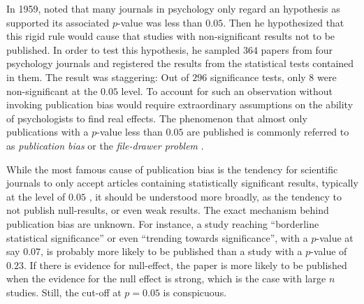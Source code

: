 In 1959,  noted that many journals in psychology only regard an hypothesis as supported its associated $p$-value was less than $0.05$. Then he hypothesized that this rigid rule would cause that studies with non-significant results not to be published. In order to test this hypothesis, he sampled $364$ papers from four psychology journals and registered the results from the statistical tests contained in them. The result was staggering: Out of $296$ significance tests, only $8$ were non-significant at the $0.05$ level. To account for such an observation without invoking publication bias would require extraordinary assumptions on the ability of psychologists to find real effects. The phenomenon that almost only publications with a $p$-value less than $0.05$ are published is commonly referred to as \emph{publication bias} or the \emph{file-drawer
problem} \parencite{rosenthal_file_1979}.

While the most famous cause of publication bias is the tendency for scientific journals to only accept articles containing statistically significant results, typically at the level of $0.05$ \parencite{simmons_false-positive_2011}, it should be understood more broadly, as the tendency to not publish null-results, or even weak results. The exact mechanism behind publication bias are unknown. For instance, a study reaching ``borderline statistical significance'' or even ``trending towards significance'', with a $p$-value at say $0.07$, is probably more likely to be published than a study with a $p$-value of $0.23$. If there is evidence for null-effect, the paper is more likely to be published when the evidence for the null effect is strong, which is the case with large $n$ studies. Still, the cut-off at $p = 0.05$ is conspicuous. 

